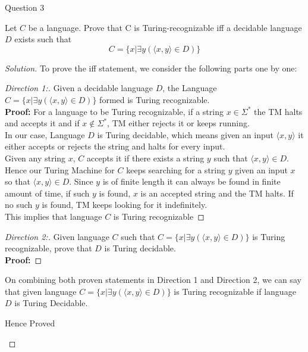 \begin{solution}{Question 3}\label{ques:3}
    \begin{question}
        Let $C$ be a language. Prove that C is Turing-recognizable iff a decidable language $D$ exists such that
        $$C = \{ x | \exists y (\langle x,y \rangle \in D) \}$$
    \end{question}
    \tcblower{}
    \begin{proof}[Solution]
    To prove the iff statement, we consider the following parts one by one:
    \begin{proof}[Direction 1:]
    Given a decidable language $D$, the Language $C = \{ x | \exists y (\langle x,y \rangle \in D) \}$ formed is Turing recognizable. 
    \\
    \textbf{Proof:}
    For a language to be Turing recognizable, if a string $x \in \Sigma^*$ the TM halts and accepts it and if $x \not\in \Sigma^*$, TM either rejects it or keeps running.\\
    In our case, Language $D$ is Turing decidable, which means given an input $\langle x,y \rangle$ it either accepts or rejects the string and halts for every input.\\
    Given any string $x$, $C$ accepts it if there exists a string $y$ such that $\langle x,y \rangle \in D$. Hence our Turing Machine for $C$ keeps searching for a string $y$ given an input $x$ so that $\langle x,y \rangle \in D$. Since $y$ is of finite length it can always be found in finite amount of time, if such $y$ is found, $x$ is an accepted string and the TM halts. If no such $y$ is found, TM keeps looking for it indefinitely.\\
    This implies that language $C$ is Turing recognizable
    \end{proof}
    
    \begin{proof}[Direction 2:]
    Given language $C$ such that $C = \{ x | \exists y (\langle x,y \rangle \in D) \}$ is Turing recognizable, prove that $D$ is Turing decidable.
    \\
    \textbf{Proof:}
    
    
    
    \end{proof}
    
    On combining both proven statements in Direction 1 and Direction 2, we can say that given language $C = \{ x | \exists y (\langle x,y \rangle \in D) \}$ is Turing recognizable if language $D$ is Turing Decidable.
    \begin{center}
        Hence Proved
    \end{center}
    \end{proof}
\end{solution}
